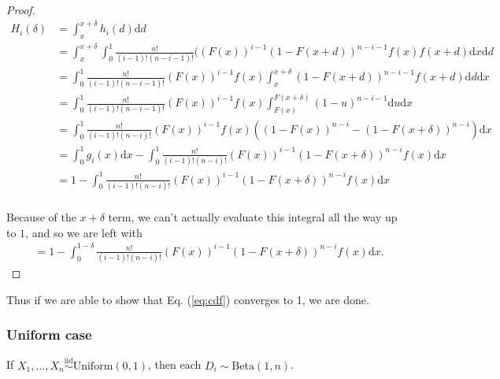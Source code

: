 \documentclass[
  11pt,
]{article}
\begin{document}
\begin{proof}
$$
\begin{aligned}
H_i(\delta) & = \int_x^{x+\delta} h_i(d) \mathrm{d}d \\
& = \int_x^{x+\delta} \int_0^{1} \frac{n!}{(i-1)! (n-i-1)!} ((F(x))^{i-1} (1 - F(x+d))^{n-i-1} f(x) f(x+d) \mathrm{d}x \mathrm{d}d \\
& = \int_0^{1} \frac{n!}{(i-1)! (n-i-1)!} (F(x))^{i-1} f(x) \int_x^{x+\delta} (1 - F(x+d))^{n-i-1} f(x+d) \mathrm{d}d \mathrm{d}x \\
& = \int_0^{1} \frac{n!}{(i-1)! (n-i-1)!} (F(x))^{i-1} f(x) \int_{F(x)}^{F(x+\delta)} (1 - u)^{n-i-1} \mathrm{d}u \mathrm{d}x \\
& = \int_0^{1} \frac{n!}{(i-1)! (n-i)!} (F(x))^{i-1} f(x) ((1 - F(x))^{n-i} - (1 - F(x + \delta))^{n-i}) \mathrm{d}x \\ 
& = \int_0^1 g_i(x) \mathrm{d}x - \int_0^1 \frac{n!}{(i-1)! (n-i)!} (F(x))^{i-1} (1 - F(x + \delta))^{n-i} f(x) \mathrm{d}x \\
& = 1 - \int_0^1 \frac{n!}{(i-1)! (n-i)!} (F(x))^{i-1} (1 - F(x + \delta))^{n-i} f(x) \mathrm{d}x \\
\end{aligned}
$$

Because of the $x + \delta$ term, we can't actually evaluate this integral all the way up to $1$, and so we are left with 
$$
\begin{aligned}
& = 1 - \int_0^{1 - \delta} \frac{n!}{(i-1)! (n-i)!} (F(x))^{i-1} (1 - F(x + \delta))^{n-i} f(x) \mathrm{d}x.
\end{aligned}
$$
\end{proof}

Thus if we are able to show that Eq. (\ref{eq:cdf}) converges to 1, we
are done.

\hypertarget{uniform-case}{%
\subsubsection{Uniform case}\label{uniform-case}}

\begin{lemma}
If $X_1, ..., X_n \stackrel{\mathrm{iid}}{\sim}\mathrm{Uniform}(0, 1)$, then each $D_i \sim \mathrm{Beta}(1, n)$.
\end{lemma}
\end{document}

